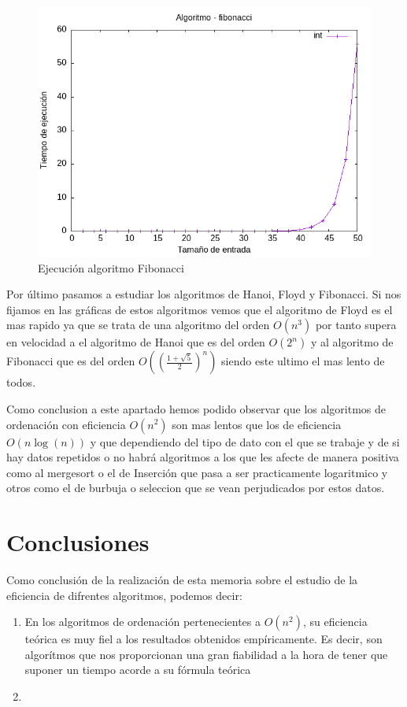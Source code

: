\documentclass[11pt]{article}
\begin{document}
    \begin{figure}[H]
        \begin{center}
            \includegraphics[width=0.5\linewidth]{assets/Img/fibonacciint.png}
            \caption{Ejecución algoritmo Fibonacci}
        \end{center}
    \end{figure}

    Por último pasamos a estudiar los algoritmos de Hanoi, Floyd y Fibonacci. Si nos fijamos en las gráficas de estos algoritmos vemos que el algoritmo de Floyd es el mas rapido ya que se trata de una algoritmo del orden \(O(n^3)\) por tanto 
    supera en velocidad a el algoritmo de Hanoi que es del orden \(O(2^n)\) y al algoritmo de Fibonacci que es del orden \(O((\frac{1+\sqrt{5}}{2})^n)\) siendo este ultimo el mas lento de todos.


    Como conclusion a este apartado hemos podido observar que los algoritmos de ordenación con eficiencia \(O(n^2)\) son mas lentos que los de eficiencia \(O(n\log(n))\) y que dependiendo del tipo de dato con el que se trabaje y de si hay datos repetidos o no habrá algoritmos a los que les afecte de manera 
    positiva como al mergesort o el de Inserción que pasa a ser practicamente logaritmico  y otros como el de burbuja o seleccion que se vean perjudicados por estos datos. 

\section{Conclusiones}
Como conclusión de la realización de esta memoria sobre el estudio de la eficiencia de difrentes algoritmos, podemos decir:
\begin{enumerate}
    \item En los algoritmos de ordenación pertenecientes a $O(n^2)$, su eficiencia teórica es muy fiel a los resultados obtenidos empíricamente.
    Es decir, son algorítmos que nos proporcionan una gran fiabilidad a la hora de tener que suponer un tiempo acorde a su fórmula teórica
    \item
\end{enumerate}
\end{document}
